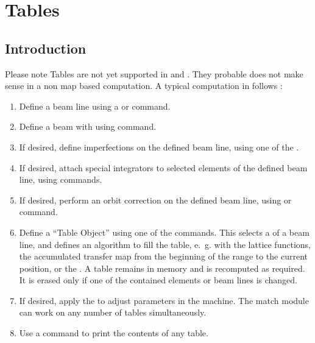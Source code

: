 \chapter{Tables}
\label{sec:tables}

\section{Introduction}
\label{sec:tabintro}

Please note Tables are not yet supported in \noopalt and \noopalcycl . They probable does not make sense in a non map based computation.  A typical computation in \opal  follows :

\begin{enumerate}
\item
  Define a beam line using a 
  or  command.
\item
  Define a beam with using  command.
\item
  If desired, define imperfections on the defined beam line,
  using one of the .
\item
  If desired, attach special integrators to selected elements of the
  defined beam line,
  using  commands.
\item
  If desired, perform an orbit correction on the defined beam line,
  using  or
   command.
\item
  Define a ``Table Object'' using one of the  commands. 
  This selects a  of a beam line,
  and defines an algorithm to fill the table,
  e.~g. with the lattice functions, 
  the accumulated transfer map from the beginning of the range to the
  current position, or the .
  A table remains in memory and is recomputed as required.
  It is erased only if one of the contained elements or beam lines is changed. 
\item
  If desired, apply the  to adjust parameters
  in the machine. The match module can work on any number of tables
  simultaneously. 
\item
  Use a  command to print the contents of any
  table. 
\end{enumerate}

